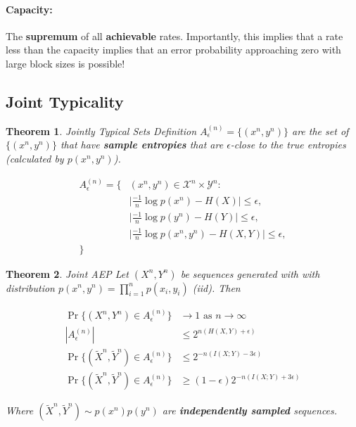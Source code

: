 \documentclass[a4paper,12pt]{report}
\newtheorem{theorem}{Theorem}
\begin{document}
\paragraph{Capacity: } The \textbf{supremum} of all \textbf{achievable} rates.
Importantly, this implies that a rate less than the capacity implies that an
error probability approaching zero with large block sizes is possible!





\subsection{Joint Typicality}

\begin{theorem}{Jointly Typical Sets Definition}
$A_\epsilon^{(n)} = \{(x^n, y^n)\}$ are the set of $\{(x^n, y^n)\}$ that have
\textbf{sample entropies} that are $\epsilon$-close to the true entropies
(calculated by $p(x^n,y^n)$). 

\begin{align}
A_\epsilon^{(n)} = \{ & (x^n, y^n) \in \mathcal X^n \times \mathcal Y^n: \\ 
& \big| \frac{-1}{n} \log p(x^n) - H(X) \big| \leq \epsilon, \\ 
& \big| \frac{-1}{n} \log p(y^n) - H(Y) \big| \leq \epsilon, \\ 
& \big| \frac{-1}{n} \log p(x^n, y^n) - H(X,Y) \big| \leq \epsilon, \\ 
\}&
\end{align}
\end{theorem}


\begin{theorem}{Joint AEP}
Let $(X^n, Y^n)$ be sequences generated with with distribution $p(x^n, y^n) =
\prod_{i=1}^n p(x_i, y_i)$ (iid). Then 

\begin{align}
\Pr\{ (X^n, Y^n) \in A_\epsilon^{(n)} \} &\to 1 \text{ as } n\to \infty \\
|A_\epsilon^{(n)}| & \leq 2^{n(H(X, Y) + \epsilon)} \\ 
\Pr\{ (\tilde X^n, \tilde Y^n) \in A_\epsilon^{(n)} \} & \leq 2^{-n(I(X; Y) - 3\epsilon)} \\
\Pr\{ (\tilde X^n, \tilde Y^n) \in A_\epsilon^{(n)} \} & \geq (1-\epsilon)2^{-n(I(X; Y) + 3\epsilon)} 
\end{align}

Where $(\tilde X^n, \tilde Y^n) \sim p(x^n)p(y^n)$ are \textbf{independently
sampled} sequences.
\end{theorem}
\end{document}
